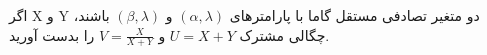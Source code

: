 \problem{}
اگر X و Y دو متغیر تصادفی مستقل گاما با پارامترهای \( (\alpha, \lambda) \) و \( (\beta, \lambda) \) باشند، چگالی مشترک \( U = X + Y \) و \( V = \frac{X}{X+Y} \) را بدست آورید.


